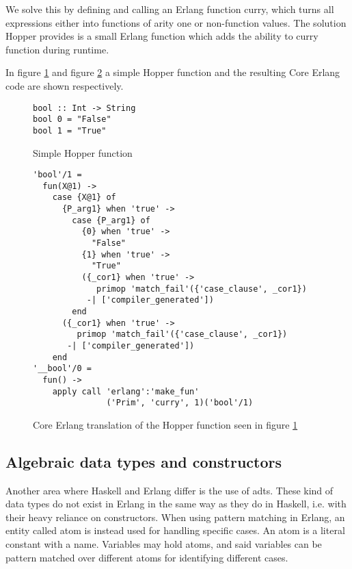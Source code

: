 We solve this by defining and calling an Erlang function curry, which turns all expressions either into functions of arity one or non-function values. The solution Hopper provides is a small Erlang function which adds the ability to curry function during runtime. 

In figure \ref{lst:hopperFun} and figure \ref{lst:coreFun} a simple Hopper function and the resulting Core Erlang code are shown respectively.

\begin{figure}[!htb]
\centering
\begin{minipage}[b]{0.38\linewidth}
\centering
\begin{lstlisting}
bool :: Int -> String
bool 0 = "False"
bool 1 = "True"
\end{lstlisting}
\end{minipage}
\caption{Simple Hopper function}
\label{lst:hopperFun}
\end{figure}

\begin{figure}[!htb]
\centering
\begin{lstlisting}
'bool'/1 =
  fun(X@1) ->
    case {X@1} of
      {P_arg1} when 'true' ->
        case {P_arg1} of
          {0} when 'true' ->
            "False"
          {1} when 'true' ->
            "True"
          ({_cor1} when 'true' ->
             primop 'match_fail'({'case_clause', _cor1})
           -| ['compiler_generated'])
        end
      ({_cor1} when 'true' ->
         primop 'match_fail'({'case_clause', _cor1})
       -| ['compiler_generated'])
    end
'__bool'/0 =
  fun() ->
    apply call 'erlang':'make_fun'
               ('Prim', 'curry', 1)('bool'/1)
\end{lstlisting}
\caption[Generated Core Erlang translation of function]
 {Core Erlang translation of the Hopper function seen in figure \ref{lst:hopperFun}}
\label{lst:coreFun}
\end{figure}

\subsection{Algebraic data types and constructors}

Another area where Haskell and Erlang differ is the use of \glspl{adt}. These kind of data types do not exist in Erlang in the same way as they do in Haskell, i.e. with their heavy reliance
on constructors. When using pattern matching in Erlang, an entity called atom is instead used for
handling specific cases. An atom is a literal constant with a name. Variables may hold atoms, and said variables can be pattern matched over different atoms for identifying different cases.

